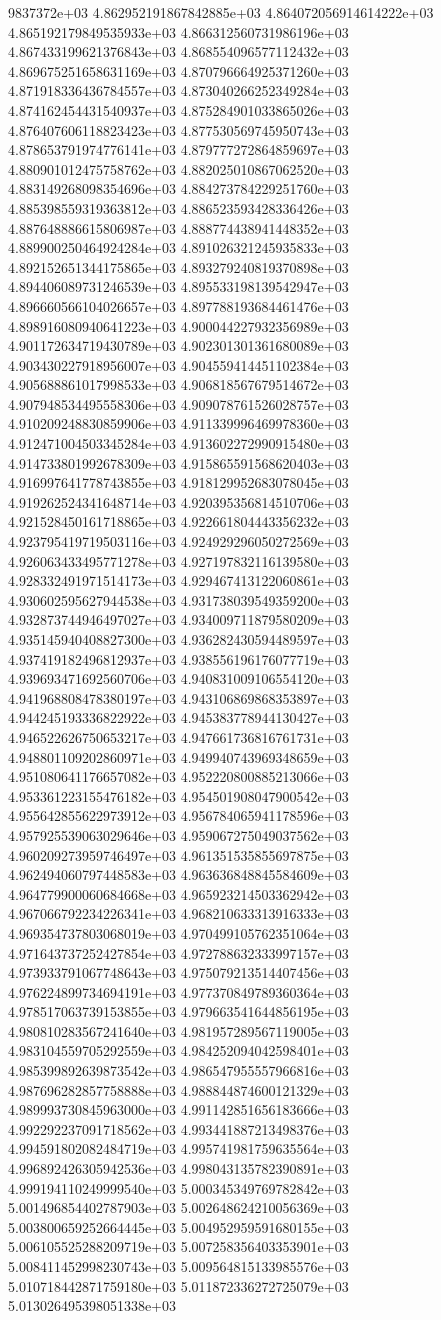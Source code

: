9837372e+03	4.862952191867842885e+03	4.864072056914614222e+03	4.865192179849535933e+03	4.866312560731986196e+03	4.867433199621376843e+03	4.868554096577112432e+03	4.869675251658631169e+03	4.870796664925371260e+03	4.871918336436784557e+03	4.873040266252349284e+03	4.874162454431540937e+03	4.875284901033865026e+03	4.876407606118823423e+03	4.877530569745950743e+03	4.878653791974776141e+03	4.879777272864859697e+03	4.880901012475758762e+03	4.882025010867062520e+03	4.883149268098354696e+03	4.884273784229251760e+03	4.885398559319363812e+03	4.886523593428336426e+03	4.887648886615806987e+03	4.888774438941448352e+03	4.889900250464924284e+03	4.891026321245935833e+03	4.892152651344175865e+03	4.893279240819370898e+03	4.894406089731246539e+03	4.895533198139542947e+03	4.896660566104026657e+03	4.897788193684461476e+03	4.898916080940641223e+03	4.900044227932356989e+03	4.901172634719430789e+03	4.902301301361680089e+03	4.903430227918956007e+03	4.904559414451102384e+03	4.905688861017998533e+03	4.906818567679514672e+03	4.907948534495558306e+03	4.909078761526028757e+03	4.910209248830859906e+03	4.911339996469978360e+03	4.912471004503345284e+03	4.913602272990915480e+03	4.914733801992678309e+03	4.915865591568620403e+03	4.916997641778743855e+03	4.918129952683078045e+03	4.919262524341648714e+03	4.920395356814510706e+03	4.921528450161718865e+03	4.922661804443356232e+03	4.923795419719503116e+03	4.924929296050272569e+03	4.926063433495771278e+03	4.927197832116139580e+03	4.928332491971514173e+03	4.929467413122060861e+03	4.930602595627944538e+03	4.931738039549359200e+03	4.932873744946497027e+03	4.934009711879580209e+03	4.935145940408827300e+03	4.936282430594489597e+03	4.937419182496812937e+03	4.938556196176077719e+03	4.939693471692560706e+03	4.940831009106554120e+03	4.941968808478380197e+03	4.943106869868353897e+03	4.944245193336822922e+03	4.945383778944130427e+03	4.946522626750653217e+03	4.947661736816761731e+03	4.948801109202860971e+03	4.949940743969348659e+03	4.951080641176657082e+03	4.952220800885213066e+03	4.953361223155476182e+03	4.954501908047900542e+03	4.955642855622973912e+03	4.956784065941178596e+03	4.957925539063029646e+03	4.959067275049037562e+03	4.960209273959746497e+03	4.961351535855697875e+03	4.962494060797448583e+03	4.963636848845584609e+03	4.964779900060684668e+03	4.965923214503362942e+03	4.967066792234226341e+03	4.968210633313916333e+03	4.969354737803068019e+03	4.970499105762351064e+03	4.971643737252427854e+03	4.972788632333997157e+03	4.973933791067748643e+03	4.975079213514407456e+03	4.976224899734694191e+03	4.977370849789360364e+03	4.978517063739153855e+03	4.979663541644856195e+03	4.980810283567241640e+03	4.981957289567119005e+03	4.983104559705292559e+03	4.984252094042598401e+03	4.985399892639873542e+03	4.986547955557966816e+03	4.987696282857758888e+03	4.988844874600121329e+03	4.989993730845963000e+03	4.991142851656183666e+03	4.992292237091718562e+03	4.993441887213498376e+03	4.994591802082484719e+03	4.995741981759635564e+03	4.996892426305942536e+03	4.998043135782390891e+03	4.999194110249999540e+03	5.000345349769782842e+03	5.001496854402787903e+03	5.002648624210056369e+03	5.003800659252664445e+03	5.004952959591680155e+03	5.006105525288209719e+03	5.007258356403353901e+03	5.008411452998230743e+03	5.009564815133985576e+03	5.010718442871759180e+03	5.011872336272725079e+03	5.013026495398051338e+03